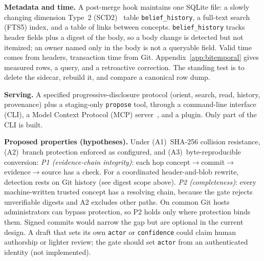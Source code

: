\documentclass[conference,letterpaper]{IEEEtran}
\begin{document}
\textbf{Metadata and time.} A post-merge hook maintains one SQLite file: a slowly changing dimension Type~2 (SCD2)~\cite{kimball} table \texttt{belief\_history}, a full-text search (FTS5) index, and a table of links between concepts. \texttt{belief\_history} tracks header fields plus a digest of the body, so a body change is detected but not itemized; an owner named only in the body is not a queryable field. Valid time comes from headers, transaction time from Git. Appendix~\ref{app:bitemporal} gives measured rows, a query, and a retroactive correction. The standing test is to delete the sidecar, rebuild it, and compare a canonical row dump.

\textbf{Serving.} A specified progressive-disclosure protocol (orient, search, read, history, provenance) plus a staging-only \texttt{propose} tool, through a command-line interface (CLI), a Model Context Protocol (MCP) server~\cite{mcp}, and a plugin. Only part of the CLI is built.

\textbf{Proposed properties (hypotheses).} Under (A1)~SHA-256 collision resistance, (A2)~branch protection enforced as configured, and (A3)~byte-reproducible conversion: \emph{P1 (evidence-chain integrity)}: each hop concept$\rightarrow$commit$\rightarrow$evidence$\rightarrow$source has a check. For a coordinated header-and-blob rewrite, detection rests on Git history (see digest scope above). \emph{P2 (completeness)}: every machine-written trusted concept has a resolving chain, because the gate rejects unverifiable digests and A2 excludes other paths. On common Git hosts administrators can bypass protection, so P2 holds only where protection binds them. Signed commits would narrow the gap but are optional in the current design. A draft that sets its own \texttt{actor} or \texttt{confidence} could claim human authorship or lighter review; the gate should set \texttt{actor} from an authenticated identity (not implemented).
\end{document}
